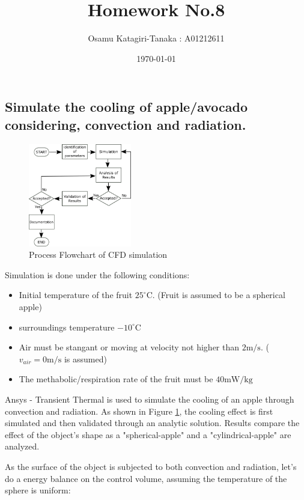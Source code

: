 \documentclass{article}
\title{Homework No.8}
\author{Osamu Katagiri-Tanaka : A01212611}
\date{\today}
\begin{document}
\maketitle

\subsection*{Simulate the cooling of apple/avocado considering, convection and radiation.}

\begin{figure}[h!]
	\centering	\includegraphics[width=0.40\textwidth]{./Flowchart.png}
	\caption{Process Flowchart of CFD simulation}
	\label{img:Flowchart}
\end{figure}

Simulation is done under the following conditions:
\begin{itemize}
\item Initial temperature of the fruit $25^{\circ} \textrm{C}$. (Fruit is assumed to be a spherical apple)
\item surroundings temperature $-10^{\circ} \textrm{C}$
\item Air must be stangant or moving at velocity not higher than $2 \textrm{m}/\textrm{s}$. ($v_{air} = 0 \textrm{m}/\textrm{s}$ is assumed)
\item The methabolic/respiration rate of the fruit must be $40 \textrm{mW} / \textrm{kg}$
\end{itemize}

Ansys - Transient Thermal is used to simulate the cooling of an apple through convection and radiation. As shown in Figure \ref{img:Flowchart}, the cooling effect is first simulated and then validated through an analytic solution. Results compare the effect of the object's shape as a "spherical-apple" and a "cylindrical-apple" are analyzed.

As the surface of the object is subjected to both convection and radiation, let's do a energy balance on the control volume, assuming the temperature of the sphere is uniform:
\end{document}
